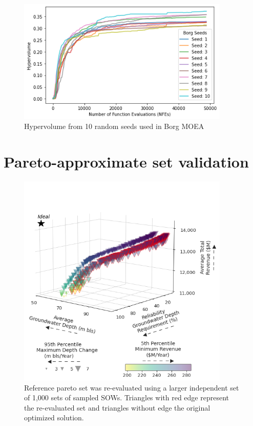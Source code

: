 \documentclass[11pt,a4paper]{article}
\begin{document}
\begin{figure}[H]
    \centering
    \includegraphics[width=0.9\textwidth]{./figs/Borg_Seeds_Hypervolume.png}
    \caption{Hypervolume from 10 random seeds used in Borg MOEA}
    \label{fig:m1esh1}
\end{figure}

\section{Pareto-approximate set validation}

\begin{figure}[H]
    \centering
    \includegraphics[width=0.9\textwidth]{./figs/validation_pareto_set.png}
    \caption{Reference pareto set was re-evaluated using a larger independent set of 1,000 sets of sampled SOWs. Triangles with red edge represent the re-evaluated set and triangles without edge the original optimized solution.}
    \label{fig:m1esh1}
\end{figure}
\end{document}
